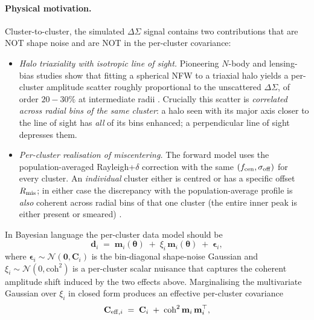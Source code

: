 \documentclass[11pt,a4paper]{article}
\newcommand{\dsig}{\Delta\Sigma}
\newcommand{\fcen}{f_{\rm cen}}
\newcommand{\sigmaoff}{\sigma_{\rm off}}
\begin{document}
\paragraph{Physical motivation.}
Cluster-to-cluster, the simulated $\dsig$ signal contains
two contributions that are NOT shape noise and are NOT in the per-cluster
covariance:
\begin{itemize}[noitemsep]
  \item \emph{Halo triaxiality with isotropic line of sight.}  Pioneering
        $N$-body and lensing-bias studies show that fitting a spherical
        NFW to a triaxial halo yields a per-cluster amplitude scatter
        roughly proportional to the unscattered $\dsig$, of order
        $20\!-\!30\%$ at intermediate radii
        \citep{JingSuto2002,Allgood2006,Corless2007,Becker2011,Oguri2012}.
        Crucially this scatter is \emph{correlated across radial bins of
        the same cluster}: a halo seen with its major axis closer to the
        line of sight has \emph{all} of its bins enhanced; a perpendicular
        line of sight depresses them.
  \item \emph{Per-cluster realisation of miscentering.}  The forward
        model uses the population-averaged Rayleigh+$\delta$ correction
        with the same $(\fcen,\sigmaoff)$ for every cluster.  An
        \emph{individual} cluster either is centred or has a specific
        offset $R_{\rm mis}$; in either case the discrepancy with the
        population-average profile is \emph{also} coherent across radial
        bins of that one cluster (the entire inner peak is either
        present or smeared)
        \citep{Johnston2007,Rykoff2016,McClintock2018,Zhang2019}.
\end{itemize}
In Bayesian language the per-cluster data model should be
\begin{equation}
  \mathbf{d}_i \;=\; \mathbf{m}_i(\boldsymbol\theta) \;+\; \xi_i\,\mathbf{m}_i(\boldsymbol\theta)
                    \;+\; \boldsymbol\epsilon_i,
  \label{eq:gen_model}
\end{equation}
where $\boldsymbol\epsilon_i \sim \mathcal{N}(\mathbf{0}, \mathbf{C}_i)$
is the bin-diagonal shape-noise Gaussian and $\xi_i \sim
\mathcal{N}(0, \mathrm{coh}^2)$ is a per-cluster scalar nuisance that
captures the coherent amplitude shift induced by the two effects above.
Marginalising the multivariate Gaussian over $\xi_i$ in closed form
\citep[\S 1.6]{Bishop2006} produces an effective per-cluster covariance
\begin{equation}
  \mathbf{C}_{{\rm eff},i} \;=\; \mathbf{C}_i \;+\;
            \mathrm{coh}^2 \,\mathbf{m}_i\,\mathbf{m}_i^\top,
  \label{eq:rank1}
\end{equation}
\end{document}
